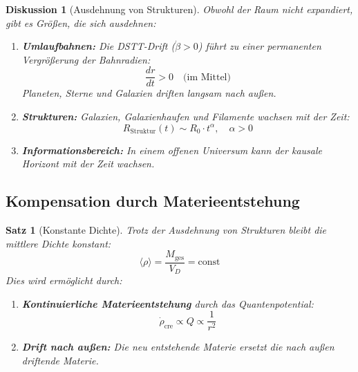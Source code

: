 \documentclass[12pt,a4paper]{article}
\newtheorem{satz}{Satz}
\newtheorem{diskussion}{Diskussion}
\begin{document}
\begin{diskussion}[Ausdehnung von Strukturen]
Obwohl der Raum nicht expandiert, gibt es Größen, die sich ausdehnen:

\begin{enumerate}
    \item \textbf{Umlaufbahnen:} Die DSTT-Drift ($\dot{\beta}>0$) führt zu einer permanenten Vergrößerung der Bahnradien:
    \begin{equation}
    \frac{dr}{dt} > 0 \quad \text{(im Mittel)}
    \end{equation}
    Planeten, Sterne und Galaxien driften langsam nach außen.
    
    \item \textbf{Strukturen:} Galaxien, Galaxienhaufen und Filamente wachsen mit der Zeit:
    \begin{equation}
    R_{\text{Struktur}}(t) \sim R_0 \cdot t^{\alpha}, \quad \alpha > 0
    \end{equation}
    
    \item \textbf{Informationsbereich:} In einem offenen Universum kann der kausale Horizont mit der Zeit wachsen.
\end{enumerate}
\end{diskussion}

\subsection{Kompensation durch Materieentstehung}

\begin{satz}[Konstante Dichte]
Trotz der Ausdehnung von Strukturen bleibt die mittlere Dichte konstant:
\begin{equation}
\langle \rho \rangle = \frac{M_{\text{ges}}}{V_D} = \text{const}
\end{equation}
Dies wird ermöglicht durch:
\begin{enumerate}
    \item \textbf{Kontinuierliche Materieentstehung} durch das Quantenpotential:
    \begin{equation}
    \dot{\rho}_{\text{cre}} \propto Q \propto \frac{1}{r^2}
    \end{equation}
    \item \textbf{Drift nach außen:} Die neu entstehende Materie ersetzt die nach außen driftende Materie.
\end{enumerate}
\end{satz}
\end{document}
